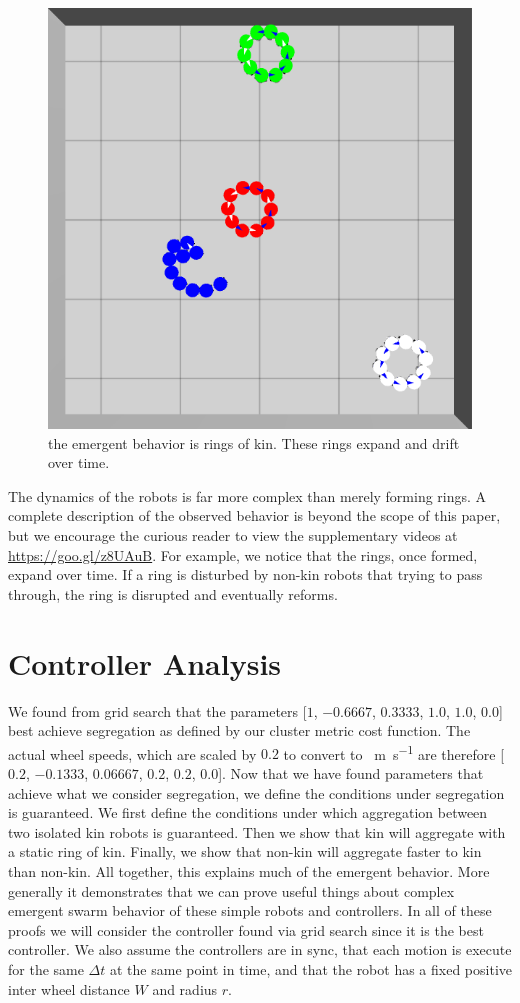 \documentclass[conference]{IEEEtran}
\begin{document}
    \begin{figure}
      \centering
      \includegraphics[width=0.7\linewidth]{./images/rings_example.png}
      \caption{the emergent behavior is rings of kin. These rings expand and drift over time.}
      \label{fig:rings}
    \end{figure}

    The dynamics of the robots is far more complex than merely forming rings. A complete description of the observed behavior is beyond the scope of this paper, but we encourage the curious reader to view the supplementary videos at \href{https://www.youtube.com/playlist?list=PL9HqYJ1IkIKVX9EsT5BY9LnBsBPTjc5bB}{https://goo.gl/z8UAuB}. For example, we notice that the rings, once formed, expand over time. If a ring is disturbed by non-kin robots that trying to pass through, the ring is disrupted and eventually reforms.

\section{Controller Analysis}

  We found from grid search that the parameters [$1$, $-0.6667$, $0.3333$, $1.0$, $1.0$, $0.0$] best achieve segregation as defined by our cluster metric cost function. The actual wheel speeds, which are scaled by $0.2$ to convert to \SI{}{\meter\per\second} are therefore [$0.2$, $-0.1333$, $0.06667$, $0.2$, $0.2$, $0.0$]. Now that we have found parameters that achieve what we consider segregation, we define the conditions under segregation is guaranteed. We first define the conditions under which aggregation between two isolated kin robots is guaranteed. Then we show that kin will aggregate with a static ring of kin. Finally, we show that non-kin will aggregate faster to kin than non-kin. All together, this explains much of the emergent behavior. More generally it demonstrates that we can prove useful things about complex emergent swarm behavior of these simple robots and controllers. In all of these proofs we will consider the controller found via grid search since it is the best controller. We also assume the controllers are in sync, that each motion is execute for the same $\Delta t$ at the same point in time, and that the robot has a fixed positive inter wheel distance $W$ and radius $r$.
\end{document}
